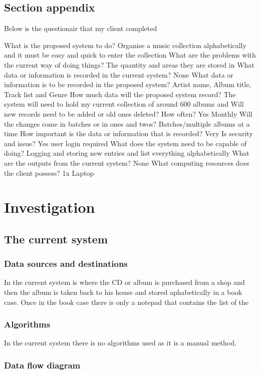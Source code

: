 \subsection{Section appendix}
Below is the questionair that my client completed

What is the proposed system to do?  
Organise a music collection alphabetically and it must be easy and quick to enter the collection
What are the problems with the current way of doing things? The quantity and areas they are stored in
What data or information is recorded in the current system?
 None
What data or information is to be recorded in the proposed system?
 Artist name, Album title, Track list and Genre
How much data will the proposed system record?
The system will need to hold my current collection of around 600 albums and 
Will new records need to be added or old ones deleted? How often?
 Yes Monthly
Will the changes come in batches or in ones and twos?
 Batches/multiple albums at a time
How important is the data or information that is recorded?
Very 
Is security and issue? 
Yes user login required
What does the system need to be capable of doing?
Logging and storing new entries and list everything alphabetically
What are the outputs from the current system?
None
What computing resources does the client possess? 1x Laptop


\section{Investigation}

\subsection{The current system}

\subsubsection{Data sources and destinations}
In the current system is where the CD or album is purchased from a shop and then the album is taken back to his house and stored aphabetically in a book case.
Once in the book case there is only a notepad that contains the list of the 
\subsubsection{Algorithms}
In the current system there is no algorithms used as it is a manual method. 
\subsubsection{Data flow diagram}


